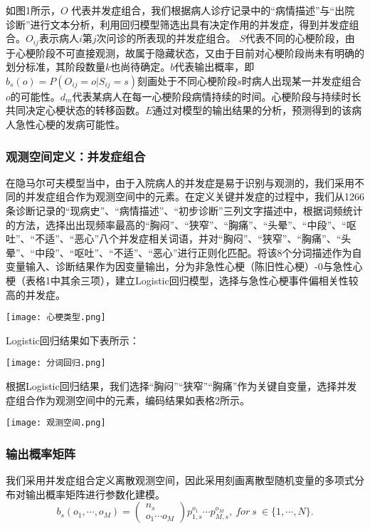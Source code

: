 \documentclass{article}
\begin{document}
如图1所示，$O$ 代表并发症组合，我们根据病人诊疗记录中的“病情描述”与“出院诊断”进行文本分析，利用回归模型筛选出具有决定作用的并发症，得到并发症组合。$O_{ij}$表示病人$i$第$j$次问诊的所表现的并发症组合。 $S$代表不同的心梗阶段，由于心梗阶段不可直接观测，故属于隐藏状态，又由于目前对心梗阶段尚未有明确的划分标准，其阶段数量$k$也尚待确定。$b$代表输出概率，即$b_s(o) =P(O_{ij}=o|S_{ij}=s) $刻画处于不同心梗阶段$s$时病人出现某一并发症组合$o$的可能性。$d_m$代表某病人在每一心梗阶段病情持续的时间。心梗阶段与持续时长共同决定心梗状态的转移函数。$E$通过对模型的输出结果的分析，预测得到的该病人急性心梗的发病可能性。

\subsubsection{观测空间定义：并发症组合}

在隐马尔可夫模型当中，由于入院病人的并发症是易于识别与观测的，我们采用不同的并发症组合作为观测空间中的元素。在定义关键并发症的过程中，我们从1266条诊断记录的“现病史”、“病情描述”、“初步诊断”三列文字描述中，根据词频统计的方法，选择出出现频率最高的“胸闷”、“狭窄”、“胸痛”、“头晕”、“中段”、“呕吐”、“不适”、“恶心”八个并发症相关词语，并对“胸闷”、“狭窄”、“胸痛”、“头晕”、“中段”、“呕吐”、“不适”、“恶心”进行正则化匹配。将该8个分词描述作为自变量输入、诊断结果作为因变量输出，分为非急性心梗（陈旧性心梗）-0与急性心梗（表格1中其余三项），建立Logistic回归模型，选择与急性心梗事件偏相关性较高的并发症。\par

\begin{center}
\texttt{[image: 心梗类型.png]}\\
\end{center}
Logistic回归结果如下表所示：
\begin{center}
\texttt{[image: 分词回归.png]}\\
\end{center}
根据Logistic回归结果，我们选择“胸闷”“狭窄”“胸痛”作为关键自变量，选择并发症组合作为观测空间中的元素，编码结果如表格2所示。
\begin{center}
\texttt{[image: 观测空间.png]}\\
\end{center}

\subsubsection{输出概率矩阵}
我们采用并发症组合定义离散观测空间，因此采用刻画离散型随机变量的多项式分布对输出概率矩阵进行参数化建模。
$$
b_s(o_1,\cdots, o_M)=\left(\begin{array}{c}
n_s \\
o_{1} \cdots o_{M}
\end{array}\right) p_{1,s}^{o_{1}} \cdots p_{M,s}^{o_{M}},\ for\ s\ \in \{1,\cdots, N\}.
$$
\end{document}
